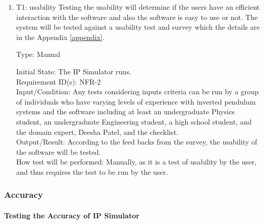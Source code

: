 \documentclass[12pt, titlepage]{article}
\begin{document}
\begin{enumerate}

\item{T1: usability}
Testing the usability will determine if the users have an efficient interaction with the software and also the software is easy to use or not. The system will be tested against a usability test and survey which the details are in the Appendix \ref{appendix}.

Type: Manual
					
Initial State: The IP Simulator runs. \\
Requirement ID(s): NFR-2\\				
Input/Condition: Any tests considering inputs criteria can be run by a group of individuals who have varying levels of experience with inverted pendulum systems and the software including  at least an undergraduate Physics student, an undergraduate Engineering student, a high school student, and the domain expert, Deesha Patel, and the checklist.\\  		
Output/Result: According to the feed backs from the survey, the usability of the software will be tested.\\
How test will be performed: Manually, as it is a test of usability by the user, and thus requires the test to be run by the user.\\

\end{enumerate}				

\subsubsection{Accuracy\label{nfr3}}

\paragraph{Testing the Accuracy of IP Simulator}
\end{document}
